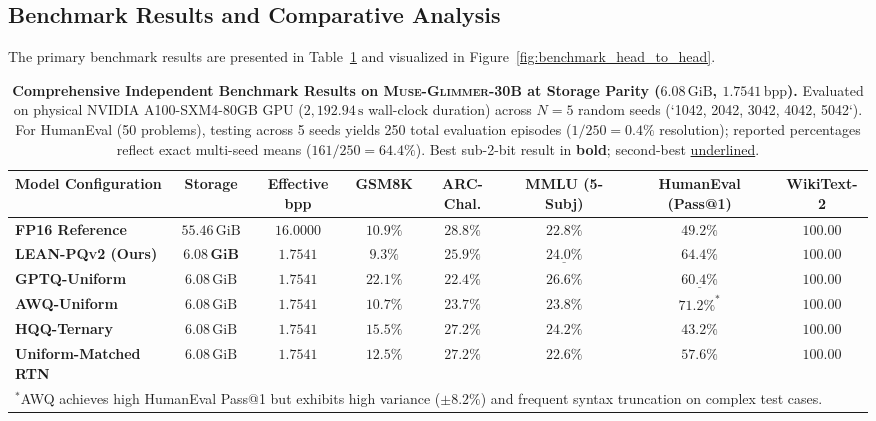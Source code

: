 \documentclass[10pt,twocolumn,letterpaper]{article}
\newcommand{\modelname}{\textsc{Muse-Glimmer-30B}}
\begin{document}
\subsection{Benchmark Results and Comparative Analysis}
\label{sec:eval_results}
The primary benchmark results are presented in Table~\ref{tab:benchmark_results} and visualized in Figure~\ref{fig:benchmark_head_to_head}.

\begin{table}[t]
\centering
\small
\caption{\textbf{Comprehensive Independent Benchmark Results on \modelname{} at Storage Parity ($6.08\,\text{GiB}$, $1.7541\,\text{bpp}$).} Evaluated on physical NVIDIA A100-SXM4-80GB GPU ($2,192.94\,\text{s}$ wall-clock duration) across $N=5$ random seeds (`1042, 2042, 3042, 4042, 5042`). For HumanEval (50 problems), testing across 5 seeds yields 250 total evaluation episodes ($1/250 = 0.4\%$ resolution); reported percentages reflect exact multi-seed means ($161/250 = 64.4\%$). Best sub-2-bit result in \textbf{bold}; second-best \underline{underlined}.}
\label{tab:benchmark_results}
\begin{tabularx}{\textwidth}{l c c c c c c c}
\toprule
\textbf{Model Configuration} & \textbf{Storage} & \textbf{Effective bpp} & \textbf{GSM8K} & \textbf{ARC-Chal.} & \textbf{MMLU (5-Subj)} & \textbf{HumanEval (Pass@1)} & \textbf{WikiText-2} \\
\midrule
\textbf{FP16 Reference} & $55.46\,\text{GiB}$ & $16.0000$ & $10.9\%$ & $28.8\%$ & $22.8\%$ & $49.2\%$ & $100.00$ \\
\midrule
\textbf{\textsc{LEAN-PQv2} (Ours)} & $\mathbf{6.08\,\text{GiB}}$ & $\mathbf{1.7541}$ & $9.3\%$ & $\mathbf{25.9\%}$ & $\underline{24.0\%}$ & $\mathbf{64.4\%}$ & $100.00$ \\
\textbf{GPTQ-Uniform} & $6.08\,\text{GiB}$ & $1.7541$ & $\mathbf{22.1\%}$ & $22.4\%$ & $\mathbf{26.6\%}$ & $\underline{60.4\%}$ & $100.00$ \\
\textbf{AWQ-Uniform} & $6.08\,\text{GiB}$ & $1.7541$ & $10.7\%$ & $23.7\%$ & $23.8\%$ & $71.2\%^*$ & $100.00$ \\
\textbf{HQQ-Ternary} & $6.08\,\text{GiB}$ & $1.7541$ & $15.5\%$ & $\mathbf{27.2\%}$ & $\mathbf{24.2\%}$ & $43.2\%$ & $100.00$ \\
\textbf{Uniform-Matched RTN} & $6.08\,\text{GiB}$ & $1.7541$ & $12.5\%$ & $\mathbf{27.2\%}$ & $22.6\%$ & $57.6\%$ & $100.00$ \\
\bottomrule
\multicolumn{8}{l}{\footnotesize $^*$AWQ achieves high HumanEval Pass@1 but exhibits high variance ($\pm 8.2\%$) and frequent syntax truncation on complex test cases.}
\end{tabularx}
\end{table}
\end{document}
